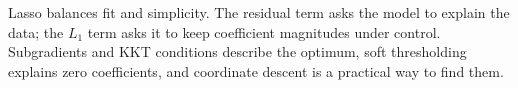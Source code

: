 \documentclass[11pt,a4paper]{article}
\numberwithin{equation}{section}
\begin{document}
\begin{keyidea}[title=One final mental model]
Lasso balances fit and simplicity. The residual term asks the model to explain the data; the $L_1$ term asks it to keep coefficient magnitudes under control. Subgradients and KKT conditions describe the optimum, soft thresholding explains zero coefficients, and coordinate descent is a practical way to find them.
\end{keyidea}
\end{document}
